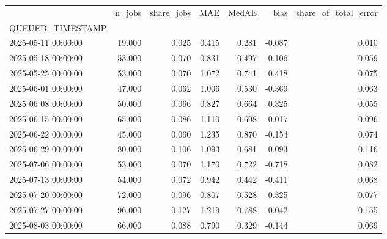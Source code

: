 \begin{tabular}{lrrrrrr}
\toprule
 & n_jobs & share_jobs & MAE & MedAE & bias & share_of_total_error \\
QUEUED_TIMESTAMP &  &  &  &  &  &  \\
\midrule
2025-05-11 00:00:00 & 19.000 & 0.025 & 0.415 & 0.281 & -0.087 & 0.010 \\
2025-05-18 00:00:00 & 53.000 & 0.070 & 0.831 & 0.497 & -0.106 & 0.059 \\
2025-05-25 00:00:00 & 53.000 & 0.070 & 1.072 & 0.741 & 0.418 & 0.075 \\
2025-06-01 00:00:00 & 47.000 & 0.062 & 1.006 & 0.530 & -0.369 & 0.063 \\
2025-06-08 00:00:00 & 50.000 & 0.066 & 0.827 & 0.664 & -0.325 & 0.055 \\
2025-06-15 00:00:00 & 65.000 & 0.086 & 1.110 & 0.698 & -0.017 & 0.096 \\
2025-06-22 00:00:00 & 45.000 & 0.060 & 1.235 & 0.870 & -0.154 & 0.074 \\
2025-06-29 00:00:00 & 80.000 & 0.106 & 1.093 & 0.681 & -0.093 & 0.116 \\
2025-07-06 00:00:00 & 53.000 & 0.070 & 1.170 & 0.722 & -0.718 & 0.082 \\
2025-07-13 00:00:00 & 54.000 & 0.072 & 0.942 & 0.442 & -0.411 & 0.068 \\
2025-07-20 00:00:00 & 72.000 & 0.096 & 0.807 & 0.528 & -0.325 & 0.077 \\
2025-07-27 00:00:00 & 96.000 & 0.127 & 1.219 & 0.788 & 0.042 & 0.155 \\
2025-08-03 00:00:00 & 66.000 & 0.088 & 0.790 & 0.329 & -0.144 & 0.069 \\
\bottomrule
\end{tabular}
